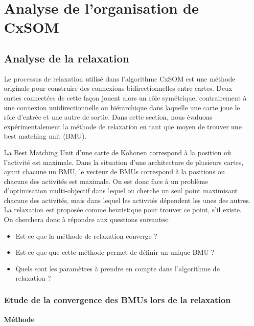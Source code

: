 \chapter{Analyse de l'organisation de CxSOM}
\graphicspath{{04-Analyse/}}
\minitoc
\section{Analyse de la relaxation}

Le processus de relaxation utilisé dans l'algorithme CxSOM est une méthode originale pour construire des connexions bidirectionnelles entre cartes. Deux cartes connectées de cette façon jouent alors un rôle symétrique, contrairement à une connexion unidirectionnelle ou hiérarchique dans laquelle une carte joue le rôle d'entrée et une autre de sortie. Dans cette section, nous évaluons expérimentalement la méthode de relaxation en tant que moyen de trouver une best matching unit (BMU). 

La Best Matching Unit d'une carte de Kohonen correspond à la position où l'activité est maximale. Dans la situation d'une architecture de plusieurs cartes, ayant chacune un BMU, le vecteur de BMUs correspond à la positions ou chacune des activités est maximale. On est donc face à un problème d'optimisation multi-objectif dans lequel on cherche un seul point maximisant chacune des activités, mais dans lequel les activités dépendent les unes des autres. La relaxation est proposée comme heuristique pour trouver ce point, s'il existe. On cherchera donc à répondre aux questions suivantes:
\begin{itemize}
\item Est-ce que la méthode de relaxation converge ?
\item Est-ce que que cette méthode permet de définir un unique BMU ?
\item Quels sont les paramètres à prendre en compte dans l'algorithme de relaxation ?
\end{itemize}

\subsection{Etude de la convergence des BMUs lors de la relaxation}\label{sec:conv}

\subsubsection{Méthode}


